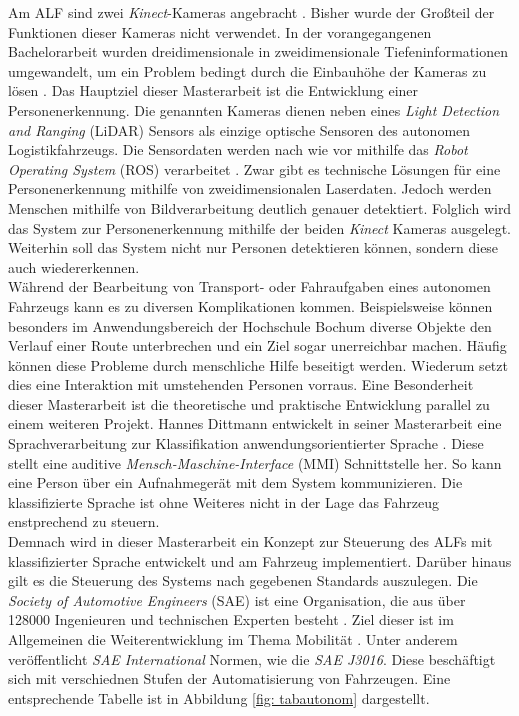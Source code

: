 		Am ALF sind zwei \textit{Kinect}-Kameras angebracht \cite{Bachelorarbeit}. Bisher wurde der Großteil der Funktionen dieser Kameras nicht verwendet. In der vorangegangenen Bachelorarbeit wurden dreidimensionale in zweidimensionale Tiefeninformationen umgewandelt, um ein Problem bedingt durch die Einbauhöhe der Kameras zu lösen \cite{Bachelorarbeit}. Das Hauptziel dieser Masterarbeit ist die Entwicklung einer Personenerkennung. Die genannten Kameras dienen neben eines \textit{Light Detection and Ranging} (LiDAR) Sensors als einzige optische Sensoren des autonomen Logistikfahrzeugs. Die Sensordaten werden nach wie vor mithilfe das \textit{Robot Operating System} (ROS) verarbeitet \cite{Bachelorarbeit}. Zwar gibt es technische Lösungen für eine Personenerkennung mithilfe von zweidimensionalen Laserdaten. Jedoch werden Menschen mithilfe von Bildverarbeitung deutlich genauer detektiert. Folglich wird das System zur Personenerkennung mithilfe der beiden \textit{Kinect} Kameras ausgelegt. Weiterhin soll das System nicht nur Personen detektieren können, sondern diese auch wiedererkennen. \\
		
		Während der Bearbeitung von Transport- oder Fahraufgaben eines autonomen Fahrzeugs kann es zu diversen Komplikationen kommen. Beispielsweise können besonders im Anwendungsbereich der Hochschule Bochum diverse Objekte den Verlauf einer Route unterbrechen und ein Ziel sogar unerreichbar machen. Häufig können diese Probleme durch menschliche Hilfe beseitigt werden. Wiederum setzt dies eine Interaktion mit umstehenden Personen vorraus. Eine Besonderheit dieser Masterarbeit ist die theoretische und praktische Entwicklung parallel zu einem weiteren Projekt. Hannes Dittmann entwickelt in seiner Masterarbeit eine Sprachverarbeitung zur Klassifikation anwendungsorientierter Sprache \cite{Dittmann}. Diese stellt eine auditive \textit{Mensch-Maschine-Interface} (MMI) Schnittstelle her. So kann eine Person über ein Aufnahmegerät mit dem System kommunizieren. Die klassifizierte Sprache ist ohne Weiteres nicht in der Lage das Fahrzeug enstprechend zu steuern.\\
		
		Demnach wird in dieser Masterarbeit ein Konzept zur Steuerung des ALFs mit klassifizierter Sprache entwickelt und am Fahrzeug implementiert. Darüber hinaus gilt es die Steuerung des Systems nach gegebenen Standards auszulegen. Die \textit{Society of Automotive Engineers} (SAE) ist eine Organisation, die aus über 128000 Ingenieuren und technischen Experten besteht \cite{saeorg}. Ziel dieser ist im Allgemeinen die Weiterentwicklung im Thema Mobilität \cite{saeorg}. Unter anderem veröffentlicht \textit{SAE International} Normen, wie die \textit{SAE J3016}. Diese beschäftigt sich mit verschiednen Stufen der Automatisierung von Fahrzeugen. Eine entsprechende Tabelle ist in Abbildung \ref{fig: tabautonom} dargestellt.\\
		
